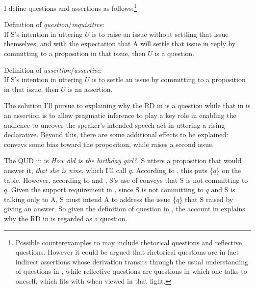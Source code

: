 \documentclass[output=paper,colorlinks,citecolor=brown]{langscibook}
\begin{document}
	\noindent I define questions and assertions as follows:\footnote{Possible counterexamples to  may include rhetorical questions and reflective questions. However it could be argued that rhetorical questions are in fact indirect assertions whose derivation transits through the usual understanding of questions in , while reflective questions are questions in which one talks to oneself, which  fits with  when viewed in that light.}
	
	\exa Definition of \emph{question}/\emph{inquisitive}: \\
	If S's intention in uttering $U$ is to raise an issue without settling that issue themselves, and with the expectation that A will settle that issue in reply by committing to a proposition in that issue, then $U$ is a question. \label{question}
	\z
	
	\exa Definition of \emph{assertion}/\emph{assertive}: \\
	If S's intention in uttering $U$ is to settle an issue by committing to a proposition in that issue, then $U$ is an assertion. \label{assertion}
	\z
	
	The solution I'll pursue to explaining why the RD in  is a question while that in  is an assertion is to allow pragmatic inference to play a key role in enabling the audience to uncover the speaker's intended speech act in uttering a rising declarative. Beyond this, there are some additional effects to be explained:  conveys some bias toward the proposition, while  raises a second issue. 
	
	The QUD in  is \emph{How old is the birthday girl?}. S utters a proposition that would answer it, \emph{that she is nine}, which I'll call $q$. According to , this puts \{$q$\} on the table. However, according to  and , S's use of \rise conveys that S is not committing to $q$. Given the support requirement in , since S is not committing to $q$ and S is talking only to A, S must intend A to address the issue \{$q$\} that S raised by giving an answer. So given the definition of question in , the account in  explains why the RD in  is regarded as a question. 
	
\end{document}
